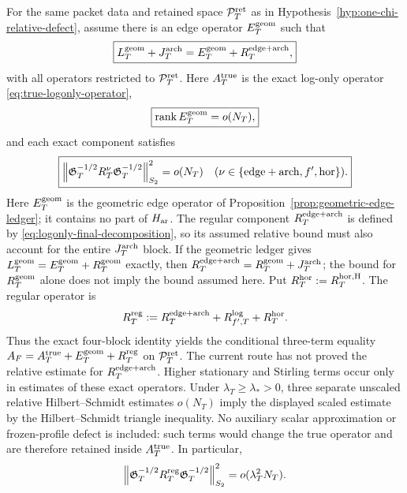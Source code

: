 \begin{hypothesis}
\label{hyp:edge-regular-bounds}
For the same packet data and retained space $\mathcal P_T^{\rm ret}$ as in
Hypothesis~\ref{hyp:one-chi-relative-defect}, assume there is an edge operator
$E_T^{\rm geom}$ such that
\begin{equation}
\boxed{
L_T^{\rm geom}+J_T^{\rm arch}
=E_T^{\rm geom}+R_T^{\rm edge+arch},
}
\label{eq:logonly-final-decomposition}
\end{equation}
with all operators restricted to $\mathcal P_T^{\rm ret}$. Here $A_T^{\rm true}$ is the exact
log-only operator \eqref{eq:true-logonly-operator},
\begin{equation}
\boxed{\operatorname{rank} E_T^{\rm geom}=o(N_T),}
\label{eq:logonly-edge-rank}
\end{equation}
and each exact component satisfies
\begin{equation}
\boxed{
\left\|\mathfrak G_T^{-1/2}R_T^\nu\mathfrak G_T^{-1/2}\right\|_{S_2}^2=o(N_T)
\quad(\nu\in\{\mathrm{edge+arch},f',\mathrm{hor}\}).
}
\label{eq:logonly-component-relative-HS}
\end{equation}
Here $E_T^{\rm geom}$ is the geometric edge operator of
Proposition~\ref{prop:geometric-edge-ledger}; it contains no part of
$H_{\rm ar}$. The regular component $R_T^{\rm edge+arch}$ is defined by
\eqref{eq:logonly-final-decomposition}, so its assumed relative bound must
also account for the entire $J_T^{\rm arch}$ block. If the geometric ledger
gives $L_T^{\rm geom}=E_T^{\rm geom}+R_T^{\rm geom}$ exactly, then
$R_T^{\rm edge+arch}=R_T^{\rm geom}+J_T^{\rm arch}$; the bound for
$R_T^{\rm geom}$ alone does not imply the bound assumed here. Put
$R_T^{\rm hor}:=R_T^{\rm hor,H}$. The regular operator is
\[
R_T^{\rm reg}:=R_T^{\rm edge+arch}+R_{f',T}^{\log}+R_T^{\rm hor}.
\]
Thus the exact four-block identity yields the conditional three-term equality
$A_F=A_T^{\rm true}+E_T^{\rm geom}+R_T^{\rm reg}$ on $\mathcal P_T^{\rm ret}$. The current
route has not proved the relative estimate for $R_T^{\rm edge+arch}$.
Higher stationary and Stirling terms
occur only in estimates of these exact operators.  Under
$\lambda_T\ge\lambda_*>0$, three separate unscaled relative
Hilbert--Schmidt estimates $o(N_T)$ imply the displayed scaled estimate by the
Hilbert--Schmidt triangle inequality.  No auxiliary scalar approximation or
frozen-profile defect is included: such terms would change the true operator
and are therefore retained inside $A_T^{\rm true}$.
In particular,
\begin{equation}
\left\|\mathfrak G_T^{-1/2}R_T^{\rm reg}\mathfrak G_T^{-1/2}\right\|_{S_2}^2
=o(\lambda_T^2N_T).
\label{eq:logonly-total-relative-HS}
\end{equation}
\end{hypothesis}
